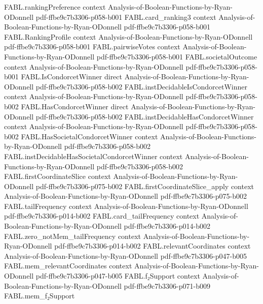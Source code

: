 \begin{theorem}
\proofstep
  {FABL.rankingPreference}
  {context}
  {Analysis-of-Boolean-Functions-by-Ryan-ODonnell}
  {pdf-ffbe9c7b3306-p058-b001}
\proofstep
  {FABL.card_ranking3}
  {context}
  {Analysis-of-Boolean-Functions-by-Ryan-ODonnell}
  {pdf-ffbe9c7b3306-p058-b001}
\proofstep
  {FABL.RankingProfile}
  {context}
  {Analysis-of-Boolean-Functions-by-Ryan-ODonnell}
  {pdf-ffbe9c7b3306-p058-b001}
\proofstep
  {FABL.pairwiseVotes}
  {context}
  {Analysis-of-Boolean-Functions-by-Ryan-ODonnell}
  {pdf-ffbe9c7b3306-p058-b001}
\proofstep
  {FABL.societalOutcome}
  {context}
  {Analysis-of-Boolean-Functions-by-Ryan-ODonnell}
  {pdf-ffbe9c7b3306-p058-b001}
\proofstep
  {FABL.IsCondorcetWinner}
  {direct}
  {Analysis-of-Boolean-Functions-by-Ryan-ODonnell}
  {pdf-ffbe9c7b3306-p058-b002}
\proofstep
  {FABL.instDecidableIsCondorcetWinner}
  {context}
  {Analysis-of-Boolean-Functions-by-Ryan-ODonnell}
  {pdf-ffbe9c7b3306-p058-b002}
\proofstep
  {FABL.HasCondorcetWinner}
  {direct}
  {Analysis-of-Boolean-Functions-by-Ryan-ODonnell}
  {pdf-ffbe9c7b3306-p058-b002}
\proofstep
  {FABL.instDecidableHasCondorcetWinner}
  {context}
  {Analysis-of-Boolean-Functions-by-Ryan-ODonnell}
  {pdf-ffbe9c7b3306-p058-b002}
\proofstep
  {FABL.HasSocietalCondorcetWinner}
  {context}
  {Analysis-of-Boolean-Functions-by-Ryan-ODonnell}
  {pdf-ffbe9c7b3306-p058-b002}
\proofstep
  {FABL.instDecidableHasSocietalCondorcetWinner}
  {context}
  {Analysis-of-Boolean-Functions-by-Ryan-ODonnell}
  {pdf-ffbe9c7b3306-p058-b002}
\proofstep
  {FABL.firstCoordinateSlice}
  {context}
  {Analysis-of-Boolean-Functions-by-Ryan-ODonnell}
  {pdf-ffbe9c7b3306-p075-b002}
\proofstep
  {FABL.firstCoordinateSlice_apply}
  {context}
  {Analysis-of-Boolean-Functions-by-Ryan-ODonnell}
  {pdf-ffbe9c7b3306-p075-b002}
\proofstep
  {FABL.tailFrequency}
  {context}
  {Analysis-of-Boolean-Functions-by-Ryan-ODonnell}
  {pdf-ffbe9c7b3306-p014-b002}
\proofstep
  {FABL.card_tailFrequency}
  {context}
  {Analysis-of-Boolean-Functions-by-Ryan-ODonnell}
  {pdf-ffbe9c7b3306-p014-b002}
\proofstep
  {FABL.zero_notMem_tailFrequency}
  {context}
  {Analysis-of-Boolean-Functions-by-Ryan-ODonnell}
  {pdf-ffbe9c7b3306-p014-b002}
\proofstep
  {FABL.relevantCoordinates}
  {context}
  {Analysis-of-Boolean-Functions-by-Ryan-ODonnell}
  {pdf-ffbe9c7b3306-p047-b005}
\proofstep
  {FABL.mem_relevantCoordinates}
  {context}
  {Analysis-of-Boolean-Functions-by-Ryan-ODonnell}
  {pdf-ffbe9c7b3306-p047-b005}
\proofstep
  {FABL.f₂Support}
  {context}
  {Analysis-of-Boolean-Functions-by-Ryan-ODonnell}
  {pdf-ffbe9c7b3306-p071-b009}
\proofstep
  {FABL.mem_f₂Support}

\end{theorem}

